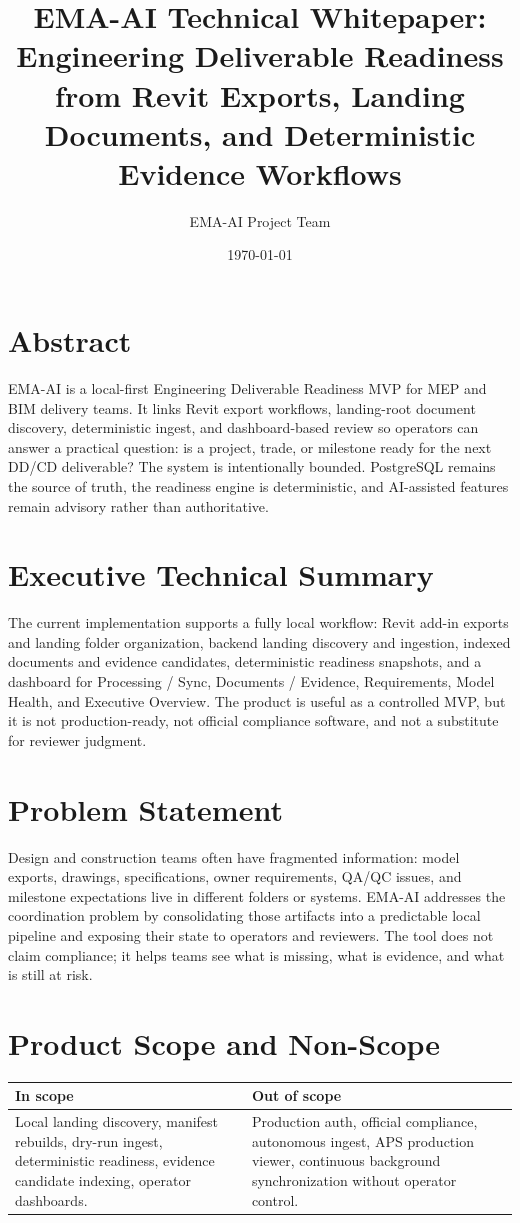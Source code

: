 \documentclass[11pt]{article}
\title{EMA-AI Technical Whitepaper: Engineering Deliverable Readiness from Revit Exports, Landing Documents, and Deterministic Evidence Workflows}
\author{EMA-AI Project Team}
\date{\today}
\begin{document}
\maketitle
\tableofcontents
\newpage

\section{Abstract}
EMA-AI is a local-first Engineering Deliverable Readiness MVP for MEP and BIM delivery teams. It links Revit export workflows, landing-root document discovery, deterministic ingest, and dashboard-based review so operators can answer a practical question: is a project, trade, or milestone ready for the next DD/CD deliverable? The system is intentionally bounded. PostgreSQL remains the source of truth, the readiness engine is deterministic, and AI-assisted features remain advisory rather than authoritative.

\section{Executive Technical Summary}
The current implementation supports a fully local workflow: Revit add-in exports and landing folder organization, backend landing discovery and ingestion, indexed documents and evidence candidates, deterministic readiness snapshots, and a dashboard for Processing / Sync, Documents / Evidence, Requirements, Model Health, and Executive Overview. The product is useful as a controlled MVP, but it is not production-ready, not official compliance software, and not a substitute for reviewer judgment.

\section{Problem Statement}
Design and construction teams often have fragmented information: model exports, drawings, specifications, owner requirements, QA/QC issues, and milestone expectations live in different folders or systems. EMA-AI addresses the coordination problem by consolidating those artifacts into a predictable local pipeline and exposing their state to operators and reviewers. The tool does not claim compliance; it helps teams see what is missing, what is evidence, and what is still at risk.

\section{Product Scope and Non-Scope}
\begin{tabularx}{\textwidth}{@{}lX@{}}
\toprule
In scope & Out of scope \\
\midrule
Local landing discovery, manifest rebuilds, dry-run ingest, deterministic readiness, evidence candidate indexing, operator dashboards. & Production auth, official compliance, autonomous ingest, APS production viewer, continuous background synchronization without operator control. \\
\bottomrule
\end{tabularx}
\end{document}
